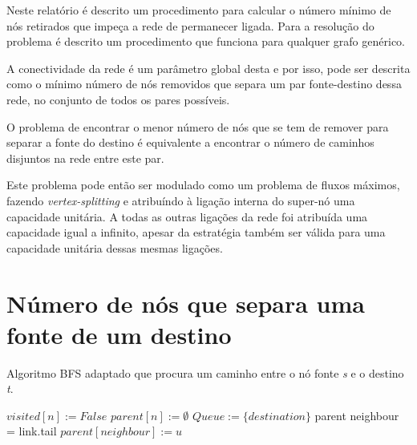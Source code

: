 \documentclass[12pt,a4paper]{scrartcl}
\begin{document}
Neste relatório é descrito um procedimento para calcular o número mínimo de nós retirados que impeça a rede de permanecer ligada. Para a resolução do problema é descrito um procedimento que funciona para qualquer grafo genérico.

A conectividade da rede é um parâmetro global desta e por isso, pode ser descrita como o mínimo número de nós removidos que separa um par fonte-destino dessa rede, no conjunto de todos os pares possíveis.

O problema de encontrar o menor número de nós que se tem de remover para separar a fonte do destino é equivalente a encontrar o número de caminhos disjuntos na rede entre este par.

Este problema pode então ser modulado como um problema de fluxos máximos, fazendo \textit{vertex-splitting} e atribuíndo à ligação interna do super-nó uma capacidade unitária. A todas as outras ligações da rede foi atribuída uma capacidade igual a infinito, apesar da estratégia também ser válida para uma capacidade unitária dessas mesmas ligações.

\section{Número de nós que separa uma fonte de um destino}



\begin{algorithm}
\caption{Algoritmo BFS adaptado que procura um caminho entre o nó fonte \textit{s} e o destino \textit{t}.}\label{alg:bfs_goal}
\begin{algorithmic}[1]
    	\State $visited[n] := False $
    	\State $parent[n] := \emptyset $
    \EndFor
    \State $Queue :=  \{destination\}$
      		\Return parent 
      \EndIf
        	\State neighbour = link.tail
				\State $parent[neighbour] := u $
            \EndIf
        \EndIf
      \EndFor
  	\EndWhile
\EndProcedure
\end{algorithmic}
\end{algorithm}
\end{document}
